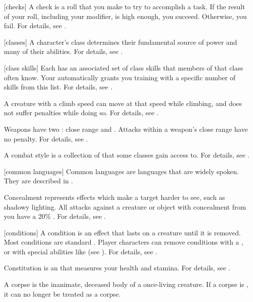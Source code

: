 [checks] A check is a roll that you make to try to accomplish a task.
If the result of your roll, including your modifier, is high enough, you succeed.
Otherwise, you fail.
For details, see .

[classes] A character's class determines their fundamental source of power and many of their abilities.
For details, see .

[class skills] Each  has an associated set of class skills that members of that class often know.
Your  automatically grants you training with a specific number of skills from this list.
For details, see .

 A creature with a climb speed can move at that speed while climbing, and does not suffer penalties while doing so.
For details, see .

 Weapons have two : close range and .
Attacks within a weapon's close range have no penalty.
For details, see .

 A combat style is a collection of  that some classes gain access to.
For details, see .

[common languages] Common languages are languages that are widely spoken.
They are described in .

 Concealment represents effects which make a target harder to see, such as shadowy lighting.
All  attacks against a creature or object with concealment from you have a 20\% .
For details, see .

[conditions] A condition is an effect that lasts on a creature until it is removed.
Most conditions are standard .
Player characters can remove conditions with a , or with special abilities like  (see ).
For details, see .

 Constitution is an  that measures your health and stamina.
For details, see .

 A corpse is the inanimate, deceased body of a once-living creature.
If a corpse is , it can no longer be treated as a corpse.

